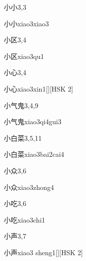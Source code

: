 \begin{entry}{小小}{3,3}
  \begin{phonetics}{小小}{xiao3xiao3}
  \end{phonetics}
\end{entry}

\begin{entry}{小区}{3,4}
  \begin{phonetics}{小区}{xiao3qu1}
  \end{phonetics}
\end{entry}

\begin{entry}{小心}{3,4}
  \begin{phonetics}{小心}{xiao3xin1}[][HSK 2]
  \end{phonetics}
\end{entry}

\begin{entry}{小气鬼}{3,4,9}
  \begin{phonetics}{小气鬼}{xiao3qi4gui3}
  \end{phonetics}
\end{entry}

\begin{entry}{小白菜}{3,5,11}
  \begin{phonetics}{小白菜}{xiao3bai2cai4}
  \end{phonetics}
\end{entry}

\begin{entry}{小众}{3,6}
  \begin{phonetics}{小众}{xiao3zhong4}
  \end{phonetics}
\end{entry}

\begin{entry}{小吃}{3,6}
  \begin{phonetics}{小吃}{xiao3chi1}
  \end{phonetics}
\end{entry}

\begin{entry}{小声}{3,7}
  \begin{phonetics}{小声}{xiao3 sheng1}[][HSK 2]
  \end{phonetics}
\end{entry}

